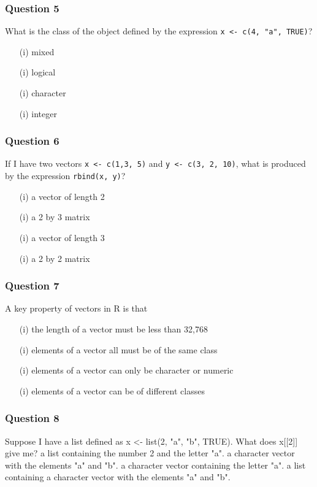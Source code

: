 \begin{frame}
\frametitle{Question 5}
\Large
What is the class of the object defined by the expression \texttt{x <- c(4, "a", TRUE)}?
\begin{itemize}
\item[(i)] mixed
\item[(i)] logical
\item[(i)] character
\item[(i)] integer
\end{itemize}
\end{frame}
\begin{frame}
\frametitle{Question 6}
\Large
If I have two vectors \texttt{x <- c(1,3, 5)} and \texttt{y <- c(3, 2, 10)}, what is produced by the expression 
\texttt{rbind(x, y)}?

\begin{itemize}
\item[(i)] a vector of length 2
\item[(i)] a 2 by 3 matrix
\item[(i)] a vector of length 3
\item[(i)] a 2 by 2 matrix
\end{itemize}



\end{frame}
\begin{frame}
\frametitle{Question 7}
\Large
A key property of vectors in R is that
\begin{itemize}
\item[(i)] the length of a vector must be less than 32,768
\item[(i)] elements of a vector all must be of the same class
\item[(i)] elements of a vector can only be character or numeric
\item[(i)] elements of a vector can be of different classes
\end{itemize}



\end{frame}
\begin{frame}
\frametitle{Question 8}
\Large
Suppose I have a list defined as x <- list(2, "a", "b", TRUE). What does x[[2]] give me?
a list containing the number 2 and the letter "a".
a character vector with the elements "a" and "b".
a character vector containing the letter "a".
a list containing a character vector with the elements "a" and "b".
\end{frame}
